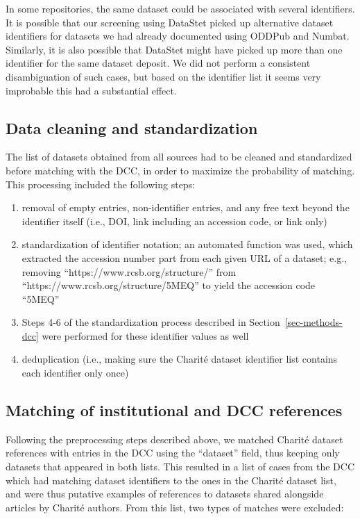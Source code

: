 \documentclass[
  letterpaper,
  DIV=11,
  numbers=noendperiod]{scrartcl}
\begin{document}
In some repositories, the same dataset could be associated with several
identifiers. It is possible that our screening using DataStet picked up
alternative dataset identifiers for datasets we had already documented
using ODDPub and Numbat. Similarly, it is also possible that DataStet
might have picked up more than one identifier for the same dataset
deposit. We did not perform a consistent disambiguation of such cases,
but based on the identifier list it seems very improbable this had a
substantial effect.

\subsection{Data cleaning and
standardization}\label{sec-methods-std-charite}

The list of datasets obtained from all sources had to be cleaned and
standardized before matching with the DCC, in order to maximize the
probability of matching. This processing included the following steps:

\begin{enumerate}
\def\labelenumi{(\arabic{enumi})}
\item
  removal of empty entries, non-identifier entries, and any free text
  beyond the identifier itself (i.e., DOI, link including an accession
  code, or link only)
\item
  standardization of identifier notation; an automated function was
  used, which extracted the accession number part from each given URL of
  a dataset; e.g., removing ``https://www.rcsb.org/structure/'' from
  ``https://www.rcsb.org/structure/5MEQ'' to yield the accession code
  ``5MEQ''
\item
  Steps 4-6 of the standardization process described in
  Section~\ref{sec-methods-dcc} were performed for these identifier
  values as well
\item
  deduplication (i.e., making sure the Charité dataset identifier list
  contains each identifier only once)
\end{enumerate}

\subsection{Matching of institutional and DCC
references}\label{sec-methods-match}

Following the preprocessing steps described above, we matched Charité
dataset references with entries in the DCC using the ``dataset'' field,
thus keeping only datasets that appeared in both lists. This resulted in
a list of cases from the DCC which had matching dataset identifiers to
the ones in the Charité dataset list, and were thus putative examples of
references to datasets shared alongside articles by Charité authors.
From this list, two types of matches were excluded:
\end{document}
